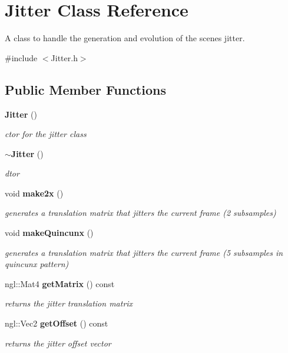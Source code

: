\section{Jitter Class Reference}
\label{class_jitter}


A class to handle the generation and evolution of the scene\textquotesingle{}s jitter.  




{\ttfamily \#include $<$Jitter.\+h$>$}

\subsection*{Public Member Functions}
\begin{DoxyCompactItemize}
\item 
\textbf{ Jitter} ()
\begin{DoxyCompactList}\small\item\em ctor for the jitter class \end{DoxyCompactList}\item 
\textbf{ $\sim$\+Jitter} ()
\begin{DoxyCompactList}\small\item\em dtor \end{DoxyCompactList}\item 
void \textbf{ make2x} ()
\begin{DoxyCompactList}\small\item\em generates a translation matrix that jitters the current frame (2 subsamples) \end{DoxyCompactList}\item 
void \textbf{ make\+Quincunx} ()
\begin{DoxyCompactList}\small\item\em generates a translation matrix that jitters the current frame (5 subsamples in quincunx pattern) \end{DoxyCompactList}\item 
ngl\+::\+Mat4 \textbf{ get\+Matrix} () const
\begin{DoxyCompactList}\small\item\em returns the jitter translation matrix \end{DoxyCompactList}\item 
ngl\+::\+Vec2 \textbf{ get\+Offset} () const
\begin{DoxyCompactList}\small\item\em returns the jitter offset vector \end{DoxyCompactList}\end{DoxyCompactItemize}
